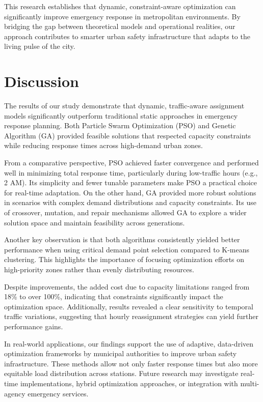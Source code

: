 \documentclass[conference]{IEEEtran}
\begin{document}
This research establishes that dynamic, constraint-aware optimization can significantly improve emergency response in metropolitan environments. By bridging the gap between theoretical models and operational realities, our approach contributes to smarter urban safety infrastructure that adapts to the living pulse of the city.
\section*{\textbf{Discussion}}

The results of our study demonstrate that dynamic, traffic-aware assignment models significantly outperform traditional static approaches in emergency response planning. Both Particle Swarm Optimization (PSO) and Genetic Algorithm (GA) provided feasible solutions that respected capacity constraints while reducing response times across high-demand urban zones.

From a comparative perspective, PSO achieved faster convergence and performed well in minimizing total response time, particularly during low-traffic hours (e.g., 2 AM). Its simplicity and fewer tunable parameters make PSO a practical choice for real-time adaptation. On the other hand, GA provided more robust solutions in scenarios with complex demand distributions and capacity constraints. Its use of crossover, mutation, and repair mechanisms allowed GA to explore a wider solution space and maintain feasibility across generations.

Another key observation is that both algorithms consistently yielded better performance when using critical demand point selection compared to K-means clustering. This highlights the importance of focusing optimization efforts on high-priority zones rather than evenly distributing resources.

Despite improvements, the added cost due to capacity limitations ranged from 18\% to over 100\%, indicating that constraints significantly impact the optimization space. Additionally, results revealed a clear sensitivity to temporal traffic variations, suggesting that hourly reassignment strategies can yield further performance gains.

In real-world applications, our findings support the use of adaptive, data-driven optimization frameworks by municipal authorities to improve urban safety infrastructure. These methods allow not only faster response times but also more equitable load distribution across stations. Future research may investigate real-time implementations, hybrid optimization approaches, or integration with multi-agency emergency services.
\end{document}
